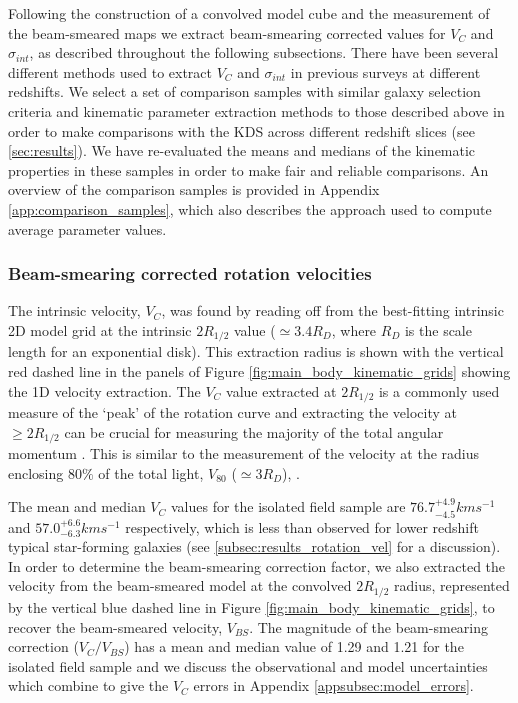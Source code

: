 \documentclass[fleqn,usenatbib]{mnras}
\begin{document}
Following the construction of a convolved model cube and the measurement of the beam-smeared maps we extract beam-smearing corrected values for $V_{C}$ and $\sigma_{int}$, as described throughout the following subsections.
There have been several different methods used to extract $V_{C}$ and $\sigma_{int}$ in previous surveys at different redshifts.
We select a set of comparison samples with similar galaxy selection criteria and kinematic parameter extraction methods to those described above in order to make comparisons with the KDS across different redshift slices (see \cref{sec:results}).
We have re-evaluated the means and medians of the kinematic properties in these samples in order to make fair and reliable comparisons.
An overview of the comparison samples is provided in Appendix \ref{app:comparison_samples}, which also describes the approach used to compute average parameter values.

\subsubsection{Beam-smearing corrected rotation velocities}\label{subsubsec:beam_smearing_corrected_velocities}
The intrinsic velocity, $V_{C}$, was found by reading off from the best-fitting intrinsic 2D model grid at the intrinsic $2R_{1/2}$ value ($\simeq3.4R_{D}$, where $R_{D}$ is the scale length for an exponential disk).
This extraction radius is shown with the vertical red dashed line in the panels of Figure \ref{fig:main_body_kinematic_grids} showing the 1D velocity extraction.
The $V_{C}$ value extracted at $2R_{1/2}$ is a commonly used measure of the `peak' of the rotation curve \citep[e.g.][]{Miller2011,Stott2016,Pelliccia2017,Harrison2017,Swinbank2017} and extracting the velocity at $\geqslant 2R_{1/2}$ can be crucial for measuring the majority of the total angular momentum \citep[e.g.][]{Obreschkow2016,Harrison2017,Swinbank2017}.
This is similar to the measurement of the velocity at the radius enclosing 80$\%$ of the total light, $V_{80}$ ($\simeq3R_{D}$), \citep{Tiley2016}.

The mean and median $V_{C}$ values for the isolated field sample are $76.7^{+4.9}_{-4.5}kms^{-1}$ and $57.0^{+6.6}_{-6.3}kms^{-1}$ respectively, which is less than observed for lower redshift typical star-forming galaxies (see \cref{subsec:results_rotation_vel} for a discussion).
In order to determine the beam-smearing correction factor, we also extracted the velocity from the beam-smeared model at the convolved $2R_{1/2}$ radius, represented by the vertical blue dashed line in Figure \ref{fig:main_body_kinematic_grids}, to recover the beam-smeared velocity, $V_{BS}$.
The magnitude of the beam-smearing correction ($V_{C}/V_{BS}$) has a mean and median value of 1.29 and 1.21 for the isolated field sample and we discuss the observational and model uncertainties which combine to give the $V_{C}$ errors in Appendix \ref{appsubsec:model_errors}. \\
\end{document}
